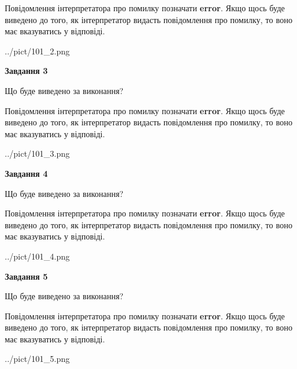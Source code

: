 \documentclass[12pt, ukrainian]{article}
\begin{document}
{\begin {large}
Повідомлення інтерпретатора про помилку позначати \textbf{error}.
Якщо щось буде виведено до того, як інтерпретатор видасть повідомлення про помилку, 
то воно має вказуватись у відповіді. \par


\begin{center}
	{../pict/101_2.png}
\end{center}
\newpage

{\begin {center}\textbf{Завдання 3}\end {center}}\par
Що буде виведено за виконання?

Повідомлення інтерпретатора про помилку позначати \textbf{error}.
Якщо щось буде виведено до того, як інтерпретатор видасть повідомлення про помилку, 
то воно має вказуватись у відповіді. \par


\begin{center}
	{../pict/101_3.png}
\end{center}
\newpage

{\begin {center}\textbf{Завдання 4}\end {center}}\par
Що буде виведено за виконання?

Повідомлення інтерпретатора про помилку позначати \textbf{error}.
Якщо щось буде виведено до того, як інтерпретатор видасть повідомлення про помилку, 
то воно має вказуватись у відповіді. \par


\begin{center}
	{../pict/101_4.png}
\end{center}
\newpage

{\begin {center}\textbf{Завдання 5}\end {center}}\par
Що буде виведено за виконання?

Повідомлення інтерпретатора про помилку позначати \textbf{error}.
Якщо щось буде виведено до того, як інтерпретатор видасть повідомлення про помилку, 
то воно має вказуватись у відповіді. \par


\begin{center}
	{../pict/101_5.png}
\end{center}
\newpage


\end{large}}
\end{document}

